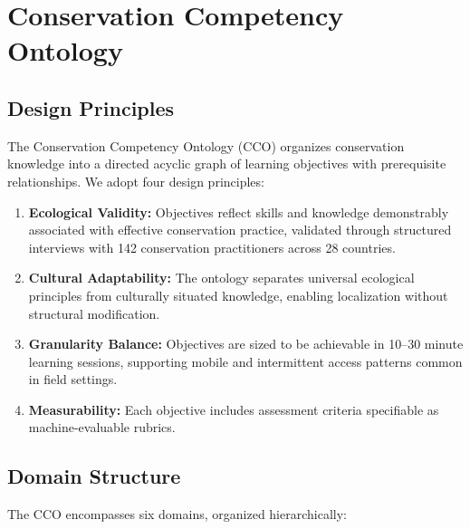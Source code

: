 \section{Conservation Competency Ontology}

\label{sec:ontology}

\subsection{Design Principles}

The Conservation Competency Ontology (CCO) organizes conservation knowledge into a directed acyclic graph of learning objectives with prerequisite relationships.
We adopt four design principles:

\begin{enumerate}[leftmargin=*]
    \item \textbf{Ecological Validity:} Objectives reflect skills and knowledge demonstrably associated with effective conservation practice, validated through structured interviews with 142 conservation practitioners across 28 countries.
    \item \textbf{Cultural Adaptability:} The ontology separates universal ecological principles from culturally situated knowledge, enabling localization without structural modification.
    \item \textbf{Granularity Balance:} Objectives are sized to be achievable in 10--30 minute learning sessions, supporting mobile and intermittent access patterns common in field settings.
    \item \textbf{Measurability:} Each objective includes assessment criteria specifiable as machine-evaluable rubrics.
\end{enumerate}

\subsection{Domain Structure}

The CCO encompasses six domains, organized hierarchically:

